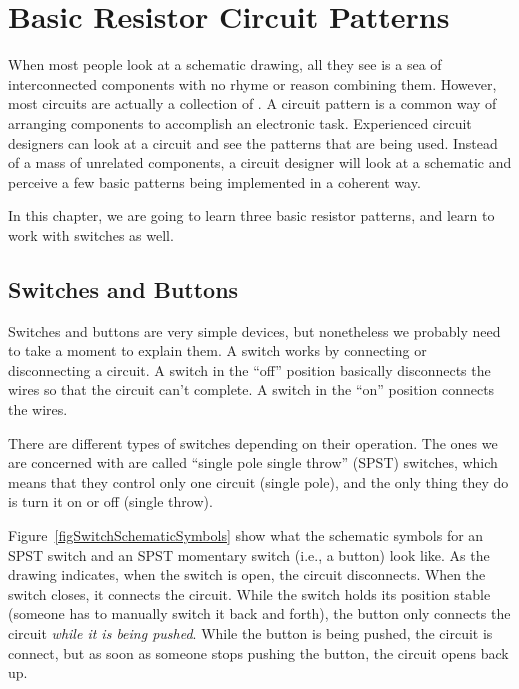 \chapter{Basic Resistor Circuit Patterns}
\label{chapBasicResistorCircuits}


When most people look at a schematic drawing, all they see is a sea of interconnected components with no rhyme or reason combining them.
However, most circuits are actually a collection of .
A circuit pattern is a common way of arranging components to accomplish an electronic task.
Experienced circuit designers can look at a circuit and see the patterns that are being used.
Instead of a mass of unrelated components, a circuit designer will look at a schematic and perceive a few basic patterns being implemented in a coherent way.

In this chapter, we are going to learn three basic resistor patterns, and learn to work with switches as well.

\section{Switches and Buttons}

Switches and buttons are very simple devices, but nonetheless we probably need to take a moment to explain them.
A switch works by connecting or disconnecting a circuit.
A switch in the ``off'' position basically disconnects the wires so that the circuit can't complete.
A switch in the ``on'' position connects the wires.

There are different types of switches depending on their operation.
The ones we are concerned with are called ``single pole single throw'' (SPST) switches, which means that they control only one circuit (single pole), and the only thing they do is turn it on or off (single throw).


Figure~\ref{figSwitchSchematicSymbols} show what the schematic symbols for an SPST switch and an SPST momentary switch (i.e., a button) look like.
As the drawing indicates, when the switch is open, the circuit disconnects.
When the switch closes, it connects the circuit.
While the switch holds its position stable (someone has to manually switch it back and forth), the button only connects the circuit \emph{while it is being pushed}.  
While the button is being pushed, the circuit is connect, but as soon as someone stops pushing the button, the circuit opens back up.

